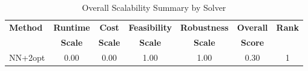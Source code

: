\begin{table}[ht]
\centering
\caption{Overall Scalability Summary by Solver}
\label{tab:scalability_summary}
\begin{tabular}{lcccccc}
\toprule
\textbf{Method} & \textbf{Runtime} & \textbf{Cost} & \textbf{Feasibility} & \textbf{Robustness} & \textbf{Overall} & \textbf{Rank} \\
\textbf{} & \textbf{Scale} & \textbf{Scale} & \textbf{Scale} & \textbf{Scale} & \textbf{Score} & \textbf{} \\
\midrule
NN+2opt & 0.00 & 0.00 & 1.00 & 1.00 & 0.30 & 1 \\
\bottomrule
\end{tabular}
\end{table}
